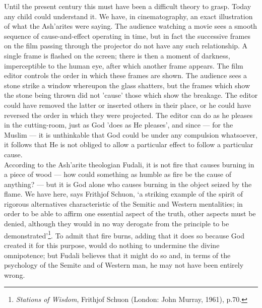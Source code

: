 \documentclass[10pt, twoside]{book}
\begin{document}
Until the present century this must have been a difficult theory to grasp. Today any child could 
understand it. We have, in cinematography, an exact illustration of what the Ash'arites were saying. 
The audience watching a movie sees a smooth sequence of cause\hyp{}and\hyp{}effect operating in time, but in 
fact the successive frames on the film passing through the projector do not have any such 
relationship. A single frame is flashed on the screen; there is then a moment of darkness, 
imperceptible to the human eye, after which another frame appears. The film editor controls the order 
in which these frames are shown. The audience sees a stone strike a window whereupon the glass 
shatters, but the frames which show the stone being thrown did not 'cause' those which show the 
breakage. The editor could have removed the latter or inserted others in their place, or he could 
have reversed the order in which they were projected. The editor can do as he pleases in the 
cutting-room, just as God 'does as He pleases', and since --- for the Muslim --- it is unthinkable that 
God could be under any compulsion whatsoever, it follows that He is not obliged to allow a particular 
effect to follow a particular cause. \\

According to the Ash'arite theologian Fudali, it is not fire that causes burning in a piece of wood --- 
how could something as humble as fire be the cause of anything? --- but it is God alone who causes 
burning in the object seized by the flame. We have here, says Frithjof Schuon, `a striking example of 
the spirit of rigorous alternatives characteristic of the Semitic and Western mentalities; in order 
to be able to affirm one essential aspect of the truth, other aspects must be denied, although they 
would in no way derogate from the principle to be demonstrated'\footnote{\emph{Stations of Wisdom}, Frithjof Schuon (London: John Murray, 1961), p.70.}. To admit that fire burns, adding 
that it does so because God created it for this purpose, would do nothing to undermine the divine 
omnipotence; but Fudali believes that it might do so and, in terms of the psychology of the Semite 
and of Western man, he may not have been entirely wrong. \\
\end{document}
